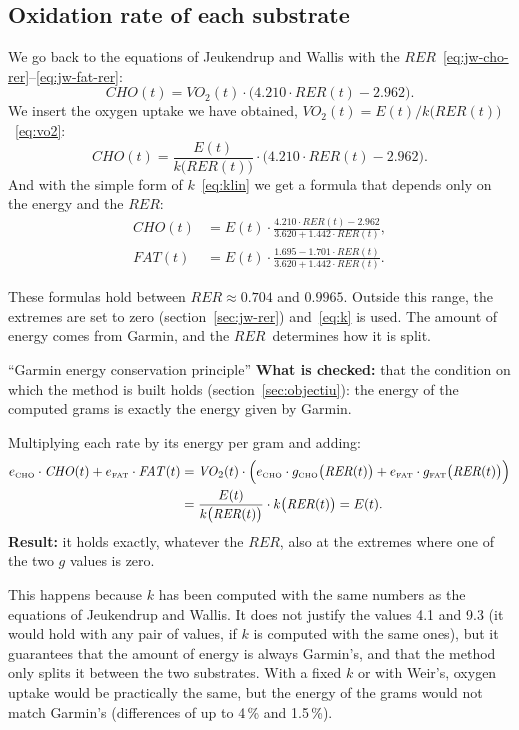 \documentclass[10pt,a4paper]{article}
\newcommand{\sub}[1]{{\scriptscriptstyle\mathrm{#1}}}   %
\newcommand{\CHO}{\sub{CHO}}
\newcommand{\FAT}{\sub{FAT}}
\newcommand{\cho}{\ensuremath{\mathit{CHO}}}               %
\newcommand{\fat}{\ensuremath{\mathit{FAT}}}
\newcommand{\VO}{\ensuremath{\mathit{VO}_2}}               %
\newcommand{\RER}{\ensuremath{\mathit{RER}}}
\begin{document}
\subsection{Oxidation rate of each substrate}\label{sec:grams}
We go back to the equations of Jeukendrup and Wallis with the
\RER~\eqref{eq:jw-cho-rer}--\eqref{eq:jw-fat-rer}:
\[
  \cho(t)=\VO(t)\cdot\bigl(4.210\cdot\RER(t)-2.962\bigr).
\]
We insert the oxygen uptake we have obtained, $\VO(t)=E(t)/k\bigl(\RER(t)\bigr)$~\eqref{eq:vo2}:
\[
  \cho(t)=\frac{E(t)}{k\bigl(\RER(t)\bigr)}\cdot\bigl(4.210\cdot\RER(t)-2.962\bigr).
\]
And with the simple form of $k$~\eqref{eq:klin} we get a formula that depends only on the
energy and the \RER:
\begin{align}
  \cho(t) &= E(t)\cdot\frac{4.210\cdot\RER(t)-2.962}{3.620+1.442\cdot\RER(t)}, \label{eq:cho-final}\\[4pt]
  \fat(t) &= E(t)\cdot\frac{1.695-1.701\cdot\RER(t)}{3.620+1.442\cdot\RER(t)}. \label{eq:fat-final}
\end{align}

These formulas hold between $\RER\approx0.704$ and $0.9965$. Outside this range, the
extremes are set to zero (section~\ref{sec:jw-rer}) and~\eqref{eq:k} is used. The amount of
energy comes from Garmin, and the \RER\ determines how it is split.

\begin{requadre}{``Garmin energy conservation principle''}
\textbf{What is checked:} that the condition on which the method is built holds
(section~\ref{sec:objectiu}): the energy of the computed grams is exactly the energy given
by Garmin.

\smallskip
Multiplying each rate by its energy per gram and adding:
\begin{equation}
\begin{aligned}
  e_{\CHO}\cdot\cho(t)+e_{\FAT}\cdot\fat(t)
  &=\VO(t)\cdot\Bigl(e_{\CHO}\cdot g_{\CHO}\bigl(\RER(t)\bigr)+e_{\FAT}\cdot g_{\FAT}\bigl(\RER(t)\bigr)\Bigr)\\
  &=\frac{E(t)}{k\bigl(\RER(t)\bigr)}\cdot k\bigl(\RER(t)\bigr)=E(t) .
\end{aligned}
  \label{eq:conservacio}
\end{equation}
\textbf{Result:} it holds exactly, whatever the \RER, also at the extremes where one of the
two $g$ values is zero.

\smallskip
This happens because $k$ has been computed with the same numbers as the equations of
Jeukendrup and Wallis. It does not justify the values 4.1 and 9.3 (it would hold with any
pair of values, if $k$ is computed with the same ones), but it guarantees that the amount of
energy is always Garmin's, and that the method only splits it between the two substrates.
With a fixed $k$ or with Weir's, oxygen uptake would be practically the same, but the
energy of the grams would not match Garmin's (differences of up to 4\,\% and 1.5\,\%).
\end{requadre}
\end{document}
